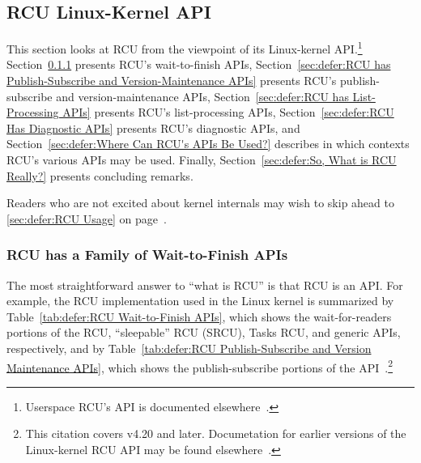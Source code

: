 
\subsection{RCU Linux-Kernel API}
\label{sec:defer:RCU Linux-Kernel API}

This section looks at RCU from the viewpoint of its Linux-kernel API.\footnote{
	Userspace RCU's API is documented
	elsewhere~\cite{PaulMcKenney2013LWNURCU}.}
Section~\ref{sec:defer:RCU has a Family of Wait-to-Finish APIs}
presents RCU's wait-to-finish APIs,
Section~\ref{sec:defer:RCU has Publish-Subscribe and Version-Maintenance APIs}
presents RCU's publish-subscribe and version-maintenance APIs,
Section~\ref{sec:defer:RCU has List-Processing APIs}
presents RCU's list-processing APIs,
Section~\ref{sec:defer:RCU Has Diagnostic APIs}
presents RCU's diagnostic APIs, and
Section~\ref{sec:defer:Where Can RCU's APIs Be Used?}
describes in which contexts RCU's various APIs may be used.
Finally,
Section~\ref{sec:defer:So, What is RCU Really?}
presents concluding remarks.

Readers who are not excited about kernel internals may wish to skip
ahead to \cref{sec:defer:RCU Usage}
on page~\pageref{sec:defer:RCU Usage}.

\subsubsection{RCU has a Family of Wait-to-Finish APIs}
\label{sec:defer:RCU has a Family of Wait-to-Finish APIs}

The most straightforward answer to ``what is RCU'' is that RCU is
an API.
For example, the RCU implementation used in the Linux kernel is
summarized by
Table~\ref{tab:defer:RCU Wait-to-Finish APIs},
which shows the wait-for-readers portions of the RCU, ``sleepable'' RCU
(SRCU), Tasks RCU, and generic APIs, respectively,
and by
Table~\ref{tab:defer:RCU Publish-Subscribe and Version Maintenance APIs},
which shows the publish-subscribe portions of the
API~\cite{PaulEMcKenney2019RCUAPI}.\footnote{
	This citation covers v4.20 and later.
	Documetation for earlier versions of the Linux-kernel RCU API may
	be found elsewhere~\cite{PaulEMcKenney2008WhatIsRCUAPI,PaulEMcKenney2014RCUAPI}.}

